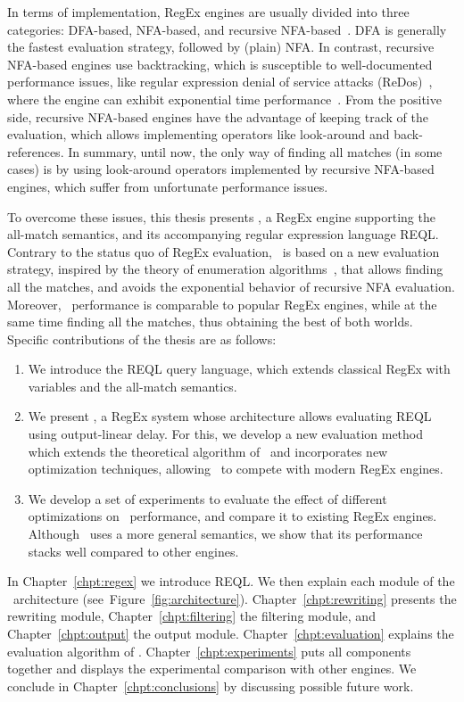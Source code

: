 In terms of implementation, RegEx engines are usually divided into three categories: DFA-based, NFA-based, and recursive NFA-based~\cite{cox2007regular}. DFA is generally the fastest evaluation strategy, followed by (plain) NFA. In contrast, recursive NFA-based engines use backtracking, which is susceptible to well-documented performance issues, like regular expression denial of service attacks (ReDos)~\cite{friedl2006mastering}, where the engine can exhibit exponential time performance~\cite{cox2007regular}. From the positive side, recursive NFA-based engines have the advantage of keeping track of the evaluation, which allows implementing operators like look-around and back-references.
In summary, until now, the only way of finding all matches (in some cases) is by using look-around operators implemented by recursive NFA-based engines, which suffer from unfortunate performance issues. 

To overcome these issues, this thesis presents \rematch, a RegEx engine supporting the all-match semantics, and its accompanying regular expression language REQL. Contrary to the status quo of RegEx evaluation, \rematch\ is based on a new evaluation strategy, inspired by the theory of enumeration algorithms~\cite{Segoufin13}, that allows finding all the matches, and avoids the exponential behavior of recursive NFA evaluation. Moreover, \rematch\ performance is comparable to popular RegEx engines, while at the same time finding all the matches, thus obtaining the best of both worlds. Specific contributions of the thesis are as follows:

\begin{enumerate}

\item  We introduce the REQL query language, which extends classical RegEx with variables and the all-match semantics.	

\item We present \rematch, a RegEx system whose architecture allows evaluating REQL using output-linear delay. For this, we develop a new evaluation method which extends the theoretical algorithm of~\cite{FlorenzanoRUVV20} and incorporates new optimization techniques, allowing \rematch\ to compete with modern RegEx engines. 

\item We develop a set of experiments to evaluate the effect of different optimizations on \rematch\ performance, and compare it to existing RegEx engines. Although \rematch\ uses a more general semantics, we show that its performance stacks well compared to other engines.
	
\end{enumerate}

In Chapter~\ref{chpt:regex} we introduce REQL. We then explain each module of the \rematch\ architecture (see~Figure~\ref{fig:architecture}). Chapter~\ref{chpt:rewriting} presents the rewriting module, Chapter~\ref{chpt:filtering} the filtering module, and Chapter~\ref{chpt:output} the output module. Chapter~\ref{chpt:evaluation} explains the evaluation algorithm of \rematch. Chapter~\ref{chpt:experiments} puts all components together and displays the experimental comparison with other engines. We conclude in Chapter~\ref{chpt:conclusions} by discussing possible future work. 
